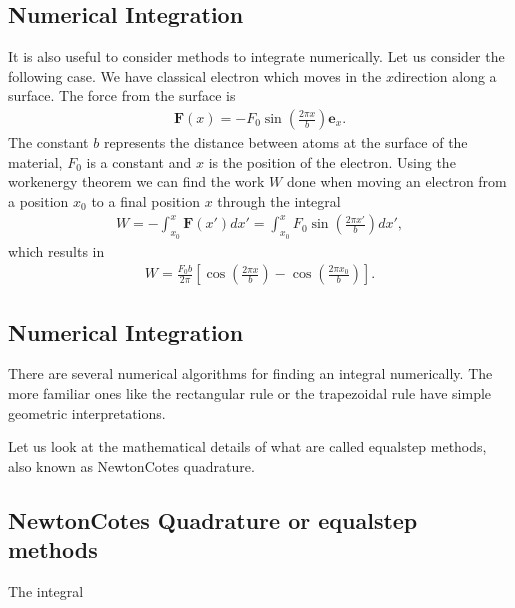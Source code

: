 \documentclass[letterpaper,10pt,english]{sphinxmanual}
\begin{document}
\subsection{Numerical Integration}
\label{\detokenize{chapter3:numerical-integration}}
It is also useful to consider methods to integrate numerically.
Let us consider the following case.
We have  classical electron which moves in the \(x\)\sphinxhyphen{}direction along a surface. The force from the surface is
\begin{equation*}
\begin{split}
\boldsymbol{F}(x)=-F_0\sin{(\frac{2\pi x}{b})}\boldsymbol{e}_x.
\end{split}
\end{equation*}
The constant \(b\) represents the distance between atoms at the surface of the material, \(F_0\) is a constant and \(x\) is the position of the electron.
Using the work\sphinxhyphen{}energy theorem we can find the work \(W\) done when moving an electron from a position \(x_0\) to a final position \(x\) through the
integral
\begin{equation*}
\begin{split}
W=-\int_{x_0}^x \boldsymbol{F}(x')dx' =  \int_{x_0}^x F_0\sin{(\frac{2\pi x'}{b})} dx',
\end{split}
\end{equation*}
which results in
\begin{equation*}
\begin{split}
W=\frac{F_0b}{2\pi}\left[\cos{(\frac{2\pi x}{b})}-\cos{(\frac{2\pi x_0}{b})}\right].
\end{split}
\end{equation*}

\subsection{Numerical Integration}
\label{\detokenize{chapter3:id1}}
There are several numerical algorithms for finding an integral
numerically. The more familiar ones like the rectangular rule or the
trapezoidal rule have simple geometric interpretations.

Let us look at the mathematical details of what are called equal\sphinxhyphen{}step methods, also known as Newton\sphinxhyphen{}Cotes quadrature.


\subsection{Newton\sphinxhyphen{}Cotes Quadrature or equal\sphinxhyphen{}step methods}
\label{\detokenize{chapter3:newton-cotes-quadrature-or-equal-step-methods}}
The integral
\end{document}
